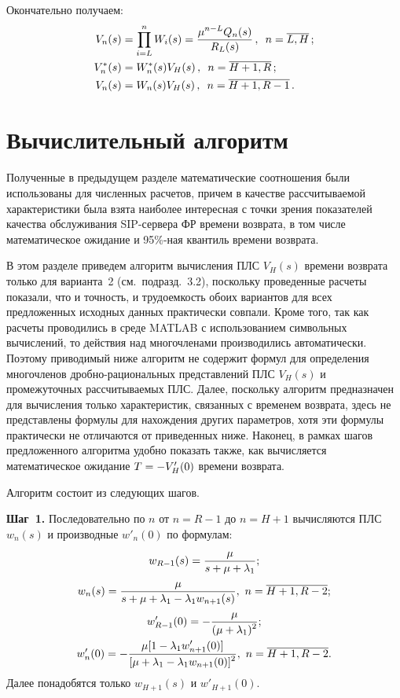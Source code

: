 \begin{multicols}{2}
Окончательно получаем:
\begin{align*}
V_{n}(s) &= \prod\limits_{i=L}^{n} W_{i}(s) =
\displaystyle\frac{\displaystyle \mu^{n-L} Q_{n}(s)\mathstrut}{\displaystyle  R_{L}(s)\mathstrut}\,,
\enskip n=\overline{L,H}\,;
\\
V^*_n(s)&= W^*_n(s) V_H(s) \,,\enskip n=\overline{H+1,R}\,;
\\
V_n(s) &= W_n(s) V_H(s) \,,\enskip n=\overline{H+1,R-1}\,.
\end{align*}

\section{Вычислительный алгоритм}

Полученные в предыдущем разделе математические соотношения были
использованы для чис\-лен\-ных расчетов, причем в качестве
рассчитываемой характеристики была взята наиболее интересная с точки
зрения показателей качества обслуживания SIP-сер\-ве\-ра ФР времени
возврата, в том числе математическое ожидание и 95\%-ная квантиль
времени возврата.


В этом разделе приведем алгоритм вычисления ПЛС $V_H(s)$ времени
возврата только для варианта~2 (см.\ подразд.~3.2), поскольку
проведенные расчеты показали, что и точность, и трудоемкость обоих
вариантов для всех предложенных исходных данных практически совпали.
Кроме того, так как расчеты проводились в среде MATLAB с
использованием символьных вычислений, то действия над многочленами
производились автоматически. Поэтому приводимый ниже алгоритм не
содержит формул для определения многочленов дроб\-но-ра\-ци\-о\-наль\-ных
представлений ПЛС $V_H(s)$ и промежуточных рассчитываемых ПЛС.
Далее, поскольку алгоритм предназначен для вычисления только
характеристик, связанных с временем возврата, здесь не представлены
формулы для нахождения других параметров, хотя эти формулы
практически не отличаются от приведенных ниже. Наконец, в рамках
шагов предложенного алгоритма удобно показать также, как вычисляется
математическое ожидание $T\hm=-V'_H(0)$ времени возврата.

Алгоритм состоит из следующих шагов.

\textbf{Шаг~1.}
Последовательно по $n$ от $n=R-1$ до $n=H+1$
вычисляются ПЛС $w_{n}(s)$ и производные
$w'_{n}(0)$ по формулам:
\begin{gather*}
w_{R-1}(s) = \displaystyle\frac{\displaystyle \mu \mathstrut}{\displaystyle s + \mu + \lambda_1\mathstrut};
\\
w_{n}(s) = \displaystyle\frac{\displaystyle \mu \mathstrut}{\displaystyle s + \mu + \lambda_1 - \lambda_1 w_{n+1}(s)\mathstrut}
,\ n=\overline{H+1,R-2};
\\
w'_{R-1}(0) = - \displaystyle\frac{\displaystyle \mu \mathstrut}{\displaystyle (\mu + \lambda_1)^2\mathstrut};
\\
w'_{n}(0) = - \displaystyle\frac{\displaystyle \mu [1 - \lambda_1 w'_{n+1}(0)]\mathstrut}{\displaystyle [\mu + \lambda_1 - \lambda_1 w_{n+1}(0)]^2\mathstrut}
,\ n=\overline{H+1,R-2}.
\end{gather*}
Далее понадобятся только $w_{H+1}(s)$ и
$w'_{H+1}(0)$.


\end{multicols}
